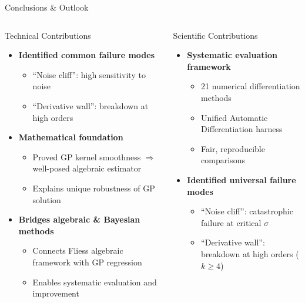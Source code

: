 \documentclass[aspectratio=169]{beamer}
\begin{document}
\begin{frame}{Conclusions \& Outlook}
\begin{columns}[T]
\begin{column}{0.32\textwidth}
\begin{block}{\small Technical Contributions}
\begin{itemize}
          \item \textbf{Identified common failure modes}
          \begin{itemize}
            \tiny
            \item ``Noise cliff'': high sensitivity to noise
            \item ``Derivative wall'': breakdown at high orders
          \end{itemize}
          
          \item \textbf{Mathematical foundation}
          \begin{itemize}
            \tiny
            \item Proved GP kernel smoothness $\Rightarrow$ well-posed algebraic estimator
            \item Explains unique robustness of GP solution
          \end{itemize}
          
          \item \textbf{Bridges algebraic \& Bayesian methods}
          \begin{itemize}
            \tiny
            \item Connects Fliess algebraic framework with GP regression
            \item Enables systematic evaluation and improvement
          \end{itemize}
        \end{itemize}
      \end{block}
    \end{column}
    
    \begin{column}{0.32\textwidth}
      \begin{block}{\small Scientific Contributions}
        \tiny
        \begin{itemize}
          \item \textbf{Systematic evaluation framework}
          \begin{itemize}
            \tiny
            \item 21 numerical differentiation methods
            \item Unified Automatic Differentiation harness
            \item Fair, reproducible comparisons
          \end{itemize}
          
          \item \textbf{Identified universal failure modes}
          \begin{itemize}
            \tiny
            \item ``Noise cliff'': catastrophic failure at critical $\sigma$
            \item ``Derivative wall'': breakdown at high orders ($k \geq 4$)
          \end{itemize}
          

\end{itemize}
\end{block}
\end{column}
\end{columns}
\end{frame}
\end{document}

